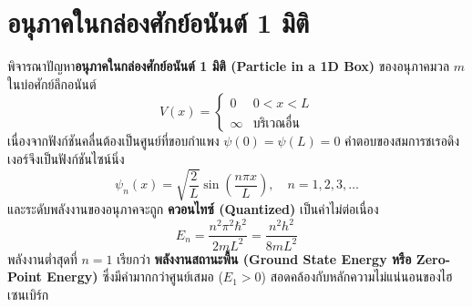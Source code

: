 \section{อนุภาคในกล่องศักย์อนันต์ 1 มิติ}

พิจารณาปัญหา\textbf{อนุภาคในกล่องศักย์อนันต์ 1 มิติ (Particle in a 1D Box)} ของอนุภาคมวล $m$ ในบ่อศักย์ลึกอนันต์
\begin{equation}
V(x) = \begin{cases} 0 & 0 < x < L \\ \infty & \text{บริเวณอื่น} \end{cases}
\end{equation}
เนื่องจากฟังก์ชันคลื่นต้องเป็นศูนย์ที่ขอบกำแพง $\psi(0) = \psi(L) = 0$ คำตอบของสมการชเรอดิงเงอร์จึงเป็นฟังก์ชันไซน์นิ่ง
\begin{equation}
\psi_n(x) = \sqrt{\frac{2}{L}} \sin\left(\frac{n\pi x}{L}\right), \quad n = 1, 2, 3, \dots
\end{equation}
และระดับพลังงานของอนุภาคจะถูก \textbf{ควอนไทซ์ (Quantized)} เป็นค่าไม่ต่อเนื่อง
\begin{equation}
E_n = \frac{n^2 \pi^2 \hbar^2}{2m L^2} = \frac{n^2 h^2}{8m L^2}
\end{equation}
พลังงานต่ำสุดที่ $n=1$ เรียกว่า \textbf{พลังงานสถานะพื้น (Ground State Energy หรือ Zero-Point Energy)} ซึ่งมีค่ามากกว่าศูนย์เสมอ ($E_1 > 0$) สอดคล้องกับหลักความไม่แน่นอนของไฮเซนเบิร์ก

